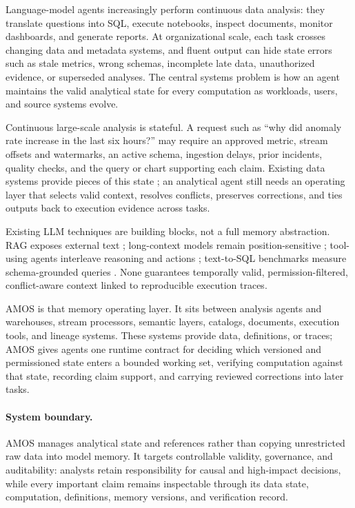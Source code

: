 \documentclass[10pt]{article}
\newcommand{\amos}{\textsc{AMOS}\xspace}
\begin{document}
Language-model agents increasingly perform continuous data analysis: they translate questions into SQL, execute notebooks, inspect documents, monitor dashboards, and generate reports. At organizational scale, each task crosses changing data and metadata systems, and fluent output can hide state errors such as stale metrics, wrong schemas, incomplete late data, unauthorized evidence, or superseded analyses. The central systems problem is how an agent maintains the valid analytical state for every computation as workloads, users, and source systems evolve.

Continuous large-scale analysis is stateful. A request such as ``why did anomaly rate increase in the last six hours?'' may require an approved metric, stream offsets and watermarks, an active schema, ingestion delays, prior incidents, quality checks, and the query or chart supporting each claim. Existing data systems provide pieces of this state \cite{millwheel,dataflow,flink,deltalake,openlineage,provdm}; an analytical agent still needs an operating layer that selects valid context, resolves conflicts, preserves corrections, and ties outputs back to execution evidence across tasks.

Existing LLM techniques are building blocks, not a full memory abstraction. RAG exposes external text \cite{rag}; long-context models remain position-sensitive \cite{lostinthemiddle}; tool-using agents interleave reasoning and actions \cite{react,toolformer}; text-to-SQL benchmarks measure schema-grounded queries \cite{spider,bird,spider2}. None guarantees temporally valid, permission-filtered, conflict-aware context linked to reproducible execution traces.

\amos is that memory operating layer. It sits between analysis agents and warehouses, stream processors, semantic layers, catalogs, documents, execution tools, and lineage systems. These systems provide data, definitions, or traces; \amos gives agents one runtime contract for deciding which versioned and permissioned state enters a bounded working set, verifying computation against that state, recording claim support, and carrying reviewed corrections into later tasks.

\paragraph{System boundary.} \amos manages analytical state and references rather than copying unrestricted raw data into model memory. It targets controllable validity, governance, and auditability: analysts retain responsibility for causal and high-impact decisions, while every important claim remains inspectable through its data state, computation, definitions, memory versions, and verification record.
\end{document}
